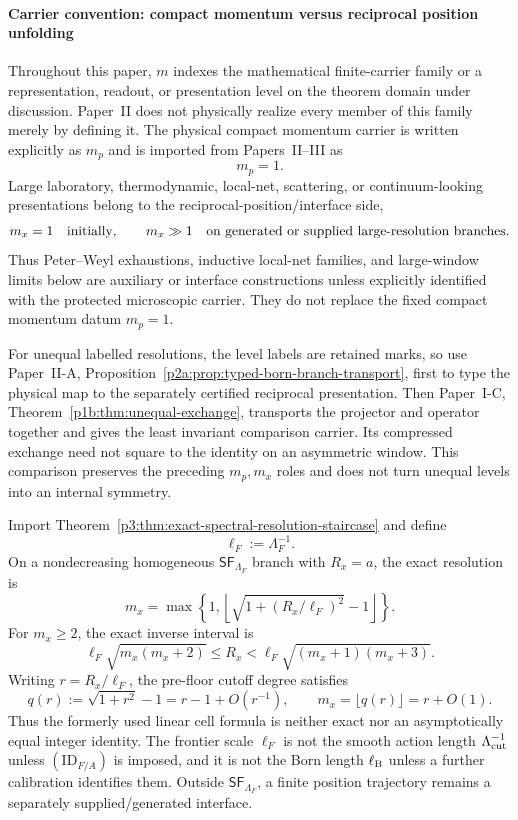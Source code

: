 \documentclass[12pt,a4paper]{article}
\begin{document}
\paragraph{Carrier convention: compact momentum versus reciprocal position unfolding}
\label{p4:sec:carrier-convention-mp-mx}

Throughout this paper, \(m\) indexes the mathematical finite-carrier family
or a representation, readout, or presentation level on the theorem domain
under discussion.  Paper~II does not physically realize every member of this
family merely by defining it.  The physical compact momentum carrier is
written explicitly as \(m_p\) and is imported from Papers~II--III as
\[
        m_p=1.
\]
Large laboratory, thermodynamic, local-net, scattering, or continuum-looking presentations belong to the reciprocal-position/interface side,
\[
        m_x=1 \quad\hbox{initially},\qquad
        m_x\gg1 \quad\hbox{on generated or supplied large-resolution branches}.
\]
Thus Peter--Weyl exhaustions, inductive local-net families, and large-window limits below are auxiliary or interface constructions unless explicitly identified with the protected microscopic carrier.  They do not replace the fixed compact momentum datum \(m_p=1\).

For unequal labelled resolutions, the level labels are retained marks, so use
Paper~II-A, Proposition~\ref{p2a:prop:typed-born-branch-transport}, first to
type the physical map to the separately certified reciprocal presentation.
Then Paper~I-C, Theorem~\ref{p1b:thm:unequal-exchange}, transports the
projector and operator together and gives the least invariant comparison
carrier.  Its compressed exchange need not square to the identity on an
asymmetric window.  This comparison preserves the preceding \(m_p,m_x\)
roles and does not turn unequal levels into an internal symmetry.

\begin{corollary}
\label{p4:cor:exact-reciprocal-position-resolution}
Import Theorem~\ref{p3:thm:exact-spectral-resolution-staircase} and define
\[
 \ell_F:=\Lambda_F^{-1}.
\]
On a nondecreasing homogeneous
\(\mathsf{SF}_{\Lambda_F}\) branch with \(R_x=a\), the exact resolution is
\[
 \boxed{
 m_x
 =\max\!\left\{1,
 \left\lfloor
 \sqrt{1+(R_x/\ell_F)^2}-1
 \right\rfloor\right\}.}
\]
For \(m_x\ge2\), the exact inverse interval is
\[
 \boxed{
 \ell_F\sqrt{m_x(m_x+2)}
 \le R_x
 <\ell_F\sqrt{(m_x+1)(m_x+3)}.}
\]
Writing \(r=R_x/\ell_F\), the pre-floor cutoff degree satisfies
\[
 q(r):=\sqrt{1+r^2}-1=r-1+O(r^{-1}),
 \qquad
 m_x=\lfloor q(r)\rfloor=r+O(1).
\]
Thus the formerly used linear cell formula is neither exact nor an
asymptotically equal integer identity.  The frontier scale \(\ell_F\) is not
the smooth action length \(\Lambda_{\rm cut}^{-1}\) unless
\((\mathrm{ID}_{F/A})\) is imposed, and it is not the Born length
\(\ell_{\rm B}\) unless a further calibration identifies them.  Outside
\(\mathsf{SF}_{\Lambda_F}\), a finite position trajectory remains
a separately supplied/generated interface.
\end{corollary}
\end{document}
